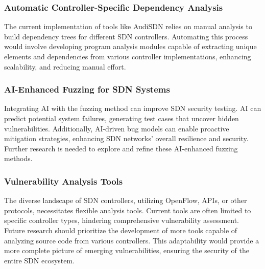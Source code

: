 \subsubsection{Automatic Controller-Specific Dependency Analysis} The current implementation of tools like AudiSDN relies on manual analysis to build dependency trees for different SDN controllers. Automating this process would involve developing program analysis modules capable of extracting unique elements and dependencies from various controller implementations, enhancing scalability, and reducing manual effort.
\subsubsection{AI-Enhanced Fuzzing for SDN Systems} Integrating AI with the fuzzing method can improve SDN security testing. AI can predict potential system failures, generating test cases that uncover hidden vulnerabilities. Additionally, AI-driven bug models can enable proactive mitigation strategies, enhancing SDN networks' overall resilience and security. Further research is needed to explore and refine these AI-enhanced fuzzing methods.

\subsubsection{Vulnerability Analysis Tools} The diverse landscape of SDN controllers, utilizing OpenFlow, APIs, or other protocols, necessitates flexible analysis tools. Current tools are often limited to specific controller types, hindering comprehensive vulnerability assessment. Future research should prioritize the development of more tools capable of analyzing source code from various controllers. This adaptability would provide a more complete picture of emerging vulnerabilities, ensuring the security of the entire SDN ecosystem.
